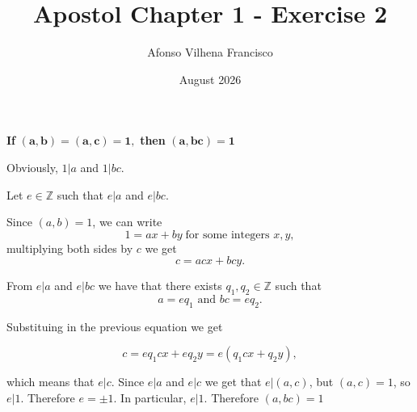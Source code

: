 \documentclass{article}
\title{Apostol Chapter 1 - Exercise 2}
\author{Afonso Vilhena Francisco}
\date{August 2026}
\begin{document}
\maketitle

\textbf{If } $\mathbf{(a,b)=(a,c)=1,}$ \textbf{then } $\mathbf{(a,bc)=1}$

\vspace{0.5cm}

Obviously, $1|a$ and $1|bc$.

Let $e \in \mathbb{Z}$ such that $e|a$ and $e|bc$.

Since $(a,b)=1$, we can write 
$$1=ax+by \;\text{for some integers }x,y,$$
multiplying both sides by $c$ we get
$$c=acx+bcy.$$

From $e|a$ and $e|bc$ we have that there exists $q_1,q_2 \in \mathbb{Z}$ such that
$$a=eq_1 \text{ and } bc=eq_2.$$

Substituing in the previous equation we get

$$c=eq_1cx+eq_2y=e(q_1cx+q_2y),$$

which means that $e|c$. Since $e|a$ and $e|c$ we get that $e|(a,c)$, but $(a,c)=1$, so $e|1$. Therefore $e=\pm1$. In particular, $e|1$. Therefore $(a,bc)=1$

\vspace{1cm}
\end{document}
